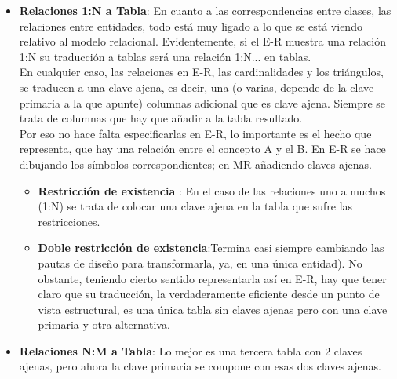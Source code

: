 \documentclass[a4paper, 12pt]{report}
\begin{document}
{\begin{enumerate}[label=(\alph*)]
\begin{itemize}
\begin{itemize}
		 		\item \textbf{PERDIDAS}: Los atributos compuestos es 	
		 		una de esas pérdidas semánticas, aunque poco 	
		 		importante. Al final, simplemente tendremos una 	
		 		columna por cada atributo simple.\\
		 		Los atributos multivaluados no tienen una traducción 	
		 		directa, hay que tomar alguna decisión de diseño y 	
		 		generar alguna tabla adicional. 
			\end{itemize}
			\item \textbf{Relaciones 1:N a Tabla}: En cuanto a las 	
			correspondencias entre clases, las relaciones entre 	
			entidades, todo está muy ligado a lo que se está viendo 	
			relativo al modelo relacional. Evidentemente, si el E-R 	
			muestra una relación 1:N su traducción a tablas será una 	
			relación 1:N... en tablas.\\
			En cualquier caso, las relaciones en E-R, las 	
			cardinalidades y los triángulos, se traducen a una clave 	
			ajena, es decir, una (o varias, depende de la clave 	
			primaria a la que apunte) columnas adicional  que es clave 			ajena. Siempre se trata de columnas que hay que añadir a 	
			la tabla resultado.\\
 			Por eso no hace falta especificarlas en E-R, lo importante 			es el hecho que representa, que hay una relación entre el 				concepto A y el B. En E-R se hace dibujando los símbolos 				correspondientes; en MR añadiendo claves ajenas. 
 			\begin{itemize}
 				\item \textbf{Restricción de existencia }: En el caso 	
 				de las relaciones uno a muchos (1:N) se trata de 	
 				colocar una clave ajena en la tabla que sufre las 	
 				restricciones.
 				\item \textbf{Doble restricción de existencia}:Termina 				casi siempre cambiando las pautas de diseño para 		
 				transformarla, ya, en una única entidad). No obstante, 				teniendo cierto sentido representarla así en E-R, hay 	
 				que tener claro que su traducción, la verdaderamente 	
 				eficiente desde un punto de vista estructural, es una 	
 				única tabla sin claves ajenas pero con una clave 	
 				primaria y otra alternativa. 
 			\end{itemize}
 			\item \textbf{Relaciones N:M a Tabla}: Lo mejor es una 	
 			tercera tabla con 2 claves ajenas, pero ahora la clave 	
 			primaria se compone con esas dos claves ajenas.\\

\end{itemize}
\end{enumerate}}
\end{document}
